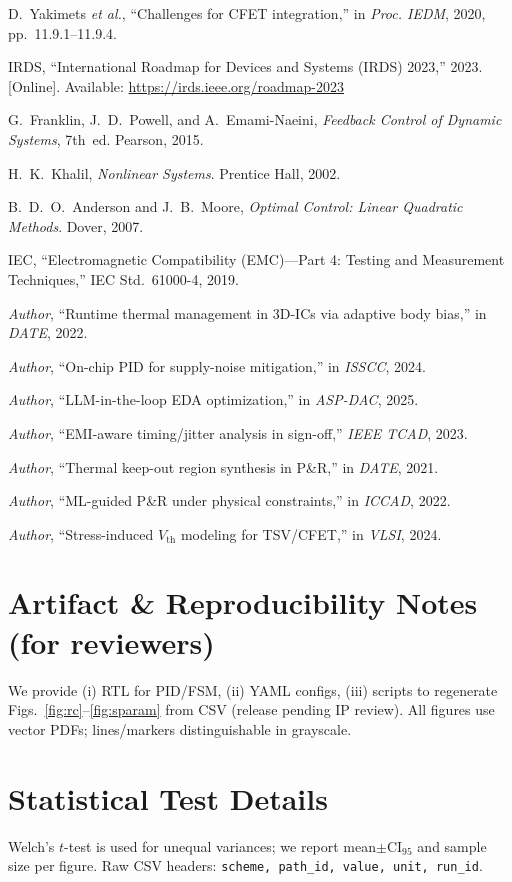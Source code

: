 \documentclass[conference]{IEEEtran}
\newcommand{\placeholder}[1]{\textit{#1}} %
\newcommand{\etal}{\textit{et al.}}
\newcommand{\CI}{\mathrm{CI}_{95}}
\begin{document}
\begin{thebibliography}{99}

D.~Yakimets \etal, ``Challenges for CFET integration,'' in \emph{Proc. IEDM}, 2020, pp.~11.9.1--11.9.4.

IRDS, ``International Roadmap for Devices and Systems (IRDS) 2023,'' 2023. [Online]. Available: \url{https://irds.ieee.org/roadmap-2023}

G.~Franklin, J.~D.~Powell, and A.~Emami-Naeini, \emph{Feedback Control of Dynamic Systems}, 7th~ed. Pearson, 2015.

H.~K.~Khalil, \emph{Nonlinear Systems}. Prentice Hall, 2002.

B.~D.~O.~Anderson and J.~B.~Moore, \emph{Optimal Control: Linear Quadratic Methods}. Dover, 2007.

IEC, ``Electromagnetic Compatibility (EMC)---Part 4: Testing and Measurement Techniques,'' IEC Std.~61000-4, 2019.

\placeholder{Author}, ``Runtime thermal management in 3D-ICs via adaptive body bias,'' in \emph{DATE}, 2022.

\placeholder{Author}, ``On-chip PID for supply-noise mitigation,'' in \emph{ISSCC}, 2024.

\placeholder{Author}, ``LLM-in-the-loop EDA optimization,'' in \emph{ASP-DAC}, 2025.

\placeholder{Author}, ``EMI-aware timing/jitter analysis in sign-off,'' \emph{IEEE TCAD}, 2023.

\placeholder{Author}, ``Thermal keep-out region synthesis in P\&R,'' in \emph{DATE}, 2021.

\placeholder{Author}, ``ML-guided P\&R under physical constraints,'' in \emph{ICCAD}, 2022.

\placeholder{Author}, ``Stress-induced $V_{\mathrm{th}}$ modeling for TSV/CFET,'' in \emph{VLSI}, 2024.

\end{thebibliography}

\appendices
\section{Artifact \& Reproducibility Notes (for reviewers)}
We provide (i) RTL for PID/FSM, (ii) YAML configs, (iii) scripts to regenerate Figs.~\ref{fig:rc}--\ref{fig:sparam} from CSV (release pending IP review). All figures use vector PDFs; lines/markers distinguishable in grayscale.

\section{Statistical Test Details}
Welch's $t$-test is used for unequal variances; we report mean$\pm\CI$ and sample size per figure. Raw CSV headers: \texttt{scheme, path\_id, value, unit, run\_id}.
\end{document}
